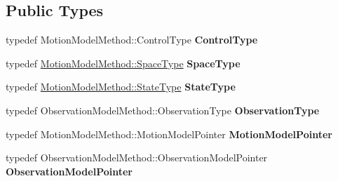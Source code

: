 \subsection*{\-Public \-Types}
\begin{DoxyCompactItemize}
\item 
\hypertarget{class_extended_k_f_a14edd0da9fb8029c87fb0206490e10b3}{typedef \*
\-Motion\-Model\-Method\-::\-Control\-Type {\bfseries \-Control\-Type}}\label{class_extended_k_f_a14edd0da9fb8029c87fb0206490e10b3}

\item 
\hypertarget{class_extended_k_f_a577b350233488edad44145be188b8838}{typedef \*
\hyperlink{class_s_e2_belief_space}{\-Motion\-Model\-Method\-::\-Space\-Type} {\bfseries \-Space\-Type}}\label{class_extended_k_f_a577b350233488edad44145be188b8838}

\item 
\hypertarget{class_extended_k_f_a390468694f87826805dc6b97e37da8ea}{typedef \*
\hyperlink{class_s_e2_belief_space_1_1_state_type}{\-Motion\-Model\-Method\-::\-State\-Type} {\bfseries \-State\-Type}}\label{class_extended_k_f_a390468694f87826805dc6b97e37da8ea}

\item 
\hypertarget{class_extended_k_f_a77ebe1a32d7ec95c8cda310ad4623e8e}{typedef \*
\-Observation\-Model\-Method\-::\-Observation\-Type {\bfseries \-Observation\-Type}}\label{class_extended_k_f_a77ebe1a32d7ec95c8cda310ad4623e8e}

\item 
\hypertarget{class_extended_k_f_a0c9bb13d2de00dd93f574d6387840441}{typedef \*
\-Motion\-Model\-Method\-::\-Motion\-Model\-Pointer {\bfseries \-Motion\-Model\-Pointer}}\label{class_extended_k_f_a0c9bb13d2de00dd93f574d6387840441}

\item 
\hypertarget{class_extended_k_f_aa60b08c63627ba5ddedd2a51b573718d}{typedef \*
\-Observation\-Model\-Method\-::\-Observation\-Model\-Pointer {\bfseries \-Observation\-Model\-Pointer}}\label{class_extended_k_f_aa60b08c63627ba5ddedd2a51b573718d}

\end{DoxyCompactItemize}
